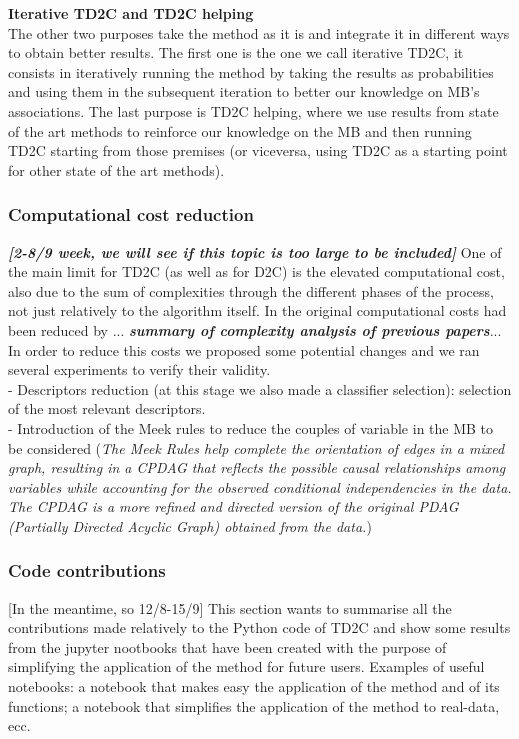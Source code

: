 \textbf{Iterative TD2C and TD2C helping}\\
The other two purposes take the method as it is and integrate it in different ways to obtain better results. The first one is the one we call iterative TD2C, it consists in iteratively running the method by taking the results as probabilities and using them in the subsequent iteration to better our knowledge on MB's associations. The last purpose is TD2C helping, where we use results from state of the art methods to reinforce our knowledge on the MB and then running TD2C starting from those premises (or viceversa, using TD2C as a starting point for other state of the art methods).

\subsubsection{Computational cost reduction}
\textbf{\textit{[2-8/9 week, we will see if this topic is too large to be included]}} One of the main limit for TD2C (as well as for D2C) is the elevated computational cost, also due to the sum of complexities through the different phases of the process, not just relatively to the algorithm itself. In \cite{bontempi2020learning} the original computational costs had been reduced by ... \textbf{\textit{summary of complexity analysis of previous papers}}... In order to reduce this costs we proposed some potential changes and we ran several experiments to verify their validity.\\
- Descriptors reduction (at this stage we also made a classifier selection): selection of the most relevant descriptors.\\
- Introduction of the Meek rules to reduce the couples of variable in the MB to be considered (\textit{The Meek Rules help complete the orientation of edges in a mixed graph, resulting in a CPDAG that reflects the possible causal relationships among variables while accounting for the observed conditional independencies in the data. The CPDAG is a more refined and directed version of the original PDAG (Partially Directed Acyclic Graph) obtained from the data.})\\


\subsubsection{Code contributions}
[In the meantime, so 12/8-15/9] This section wants to summarise all the contributions made relatively to the Python code of TD2C and show some results from the jupyter nootbooks that  have been created with the purpose of simplifying the application of the method for future users. Examples of useful notebooks: a notebook that makes easy the application of the method and of its functions; a notebook that simplifies the application of the method to real-data, ecc.

